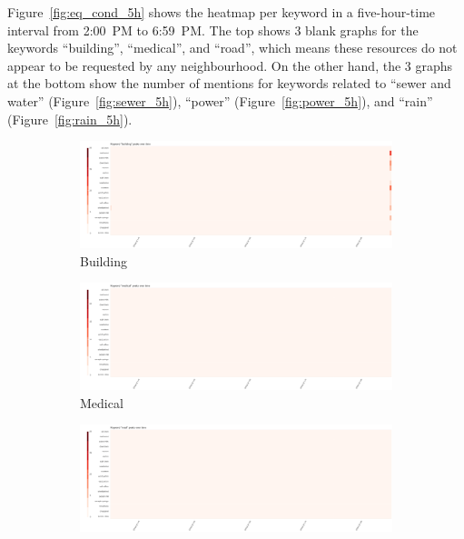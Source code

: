Figure~\ref{fig:eq_cond_5h} shows the heatmap per keyword in a five-hour-time 
interval from 2:00~PM to 6:59~PM. The top shows 3 blank graphs for the keywords
``building'', ``medical'', and ``road'', which means these resources do not 
appear to be requested by any neighbourhood. On the other hand, the 3 graphs at
the bottom show the number of mentions for keywords related to 
``sewer and water'' (Figure~\ref{fig:sewer_5h}), 
``power'' (Figure~\ref{fig:power_5h}), and ``rain'' (Figure~\ref{fig:rain_5h}). 

\begin{figure}[!h]
    \centering
    \begin{subfigure}[!h]{0.32\textwidth}
        \centering
        \includegraphics[width=1.00\textwidth]{figs/cond_5h/cond_5h_build.png}
        \caption{Building}
        \label{fig:build_5h}
    \end{subfigure}
    \begin{subfigure}[!h]{0.32\textwidth}
        \centering
        \includegraphics[width=1.00\textwidth]{figs/cond_5h/cond_5h_medical.png}
        \caption{Medical}
        \label{fig:medical_5h}
    \end{subfigure}
    \begin{subfigure}[!h]{0.32\textwidth}
        \centering
        \includegraphics[width=1.00\textwidth]{figs/cond_5h/cond_5h_road.png}

\end{subfigure}
\end{figure}

